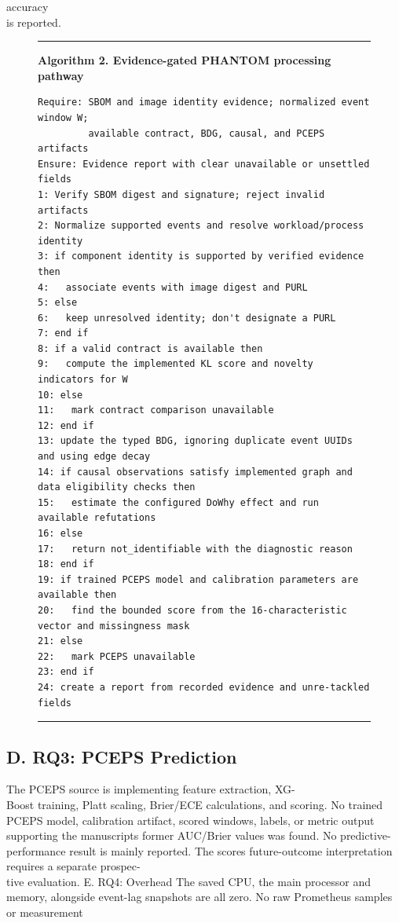 \documentclass[conference]{IEEEtran}
\begin{document}
accuracy\\
is reported. \begin{figure}[t]
\centering\footnotesize
\begin{minipage}{\columnwidth}
\hrule\smallskip
\textbf{Algorithm 2. Evidence-gated PHANTOM processing pathway}\par\smallskip
\begin{verbatim}
Require: SBOM and image identity evidence; normalized event window W;
         available contract, BDG, causal, and PCEPS artifacts
Ensure: Evidence report with clear unavailable or unsettled fields
1: Verify SBOM digest and signature; reject invalid artifacts
2: Normalize supported events and resolve workload/process identity
3: if component identity is supported by verified evidence then
4:   associate events with image digest and PURL
5: else
6:   keep unresolved identity; don't designate a PURL
7: end if
8: if a valid contract is available then
9:   compute the implemented KL score and novelty indicators for W
10: else
11:   mark contract comparison unavailable
12: end if
13: update the typed BDG, ignoring duplicate event UUIDs and using edge decay
14: if causal observations satisfy implemented graph and data eligibility checks then
15:   estimate the configured DoWhy effect and run available refutations
16: else
17:   return not_identifiable with the diagnostic reason
18: end if
19: if trained PCEPS model and calibration parameters are available then
20:   find the bounded score from the 16-characteristic vector and missingness mask
21: else
22:   mark PCEPS unavailable
23: end if
24: create a report from recorded evidence and unre-tackled fields
\end{verbatim}
\smallskip\hrule
\end{minipage}
\end{figure}
\subsection*{D. RQ3: PCEPS Prediction}
The PCEPS source is implementing feature extraction, XG-\\Boost training, Platt scaling, Brier/ECE calculations, and scoring. No trained PCEPS model, calibration artifact, scored windows, labels, or metric output supporting the manuscript\textquotesingle s former AUC/Brier values was found. No predictive-performance result is mainly reported. The score\textquotesingle s future-outcome interpretation requires a separate prospec-\\tive evaluation. E. RQ4: Overhead The saved CPU, the main processor and memory, alongside event-lag snapshots are all zero. No raw Prometheus samples or measurement
\end{document}
